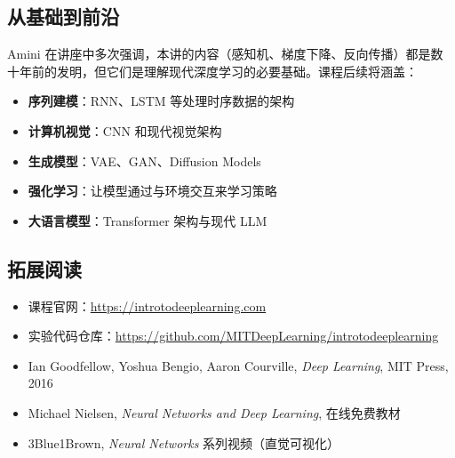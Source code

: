 \documentclass[a4paper]{article}
\begin{document}
\subsection{从基础到前沿}

Amini 在讲座中多次强调，本讲的内容（感知机、梯度下降、反向传播）都是数十年前的发明，但它们是理解现代深度学习的必要基础。课程后续将涵盖：

\begin{itemize}
\item \textbf{序列建模}：RNN、LSTM 等处理时序数据的架构
\item \textbf{计算机视觉}：CNN 和现代视觉架构
\item \textbf{生成模型}：VAE、GAN、Diffusion Models
\item \textbf{强化学习}：让模型通过与环境交互来学习策略
\item \textbf{大语言模型}：Transformer 架构与现代 LLM
\end{itemize}

\subsection{拓展阅读}

\begin{itemize}
\item 课程官网：\url{https://introtodeeplearning.com}
\item 实验代码仓库：\url{https://github.com/MITDeepLearning/introtodeeplearning}
\item Ian Goodfellow, Yoshua Bengio, Aaron Courville, \textit{Deep Learning}, MIT Press, 2016
\item Michael Nielsen, \textit{Neural Networks and Deep Learning}, 在线免费教材
\item 3Blue1Brown, \textit{Neural Networks} 系列视频（直觉可视化）
\end{itemize}

\end{document}
